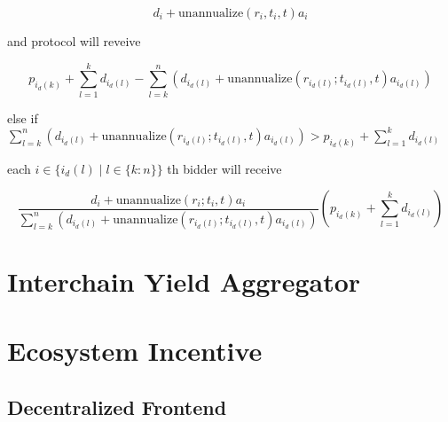 \documentclass[dvipdfmx]{jsarticle}
\begin{document}
$$
  d_i + \text{unannualize}(r_i, t_i, t) a_i
$$

and protocol will reveive

$$
  p_{i_d(k)} + \sum_{l=1}^k d_{i_d(l)} - \sum_{l=k}^n \left(d_{i_d(l)} + \text{unannualize}(r_{i_d(l)}; t_{i_d(l)}, t) a_{i_d(l)} \right)
$$

else if $\sum_{l=k}^n \left(d_{i_d(l)} + \text{unannualize}(r_{i_d(l)}; t_{i_d(l)}, t) a_{i_d(l)} \right) > p_{i_d(k)} + \sum_{l=1}^k d_{i_d(l)}$

each $i \in \{i_d(l) \mid l \in \{k:n\}\}$ th bidder will receive

$$
  \frac{d_i + \text{unannualize}(r_i; t_i, t) a_i}{\sum_{l=k}^n \left(d_{i_d(l)} + \text{unannualize}(r_{i_d(l)}; t_{i_d(l)}, t) a_{i_d(l)} \right)} \left( p_{i_d(k)} + \sum_{l=1}^k d_{i_d(l)} \right)
$$

\section{Interchain Yield Aggregator}

\section{Ecosystem Incentive}

\subsection{Decentralized Frontend}
\end{document}
